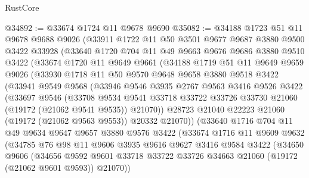 \begin{lexlean}{RustCore}
\begin{coremodule}
@34892 := @33674 @1724 @11 @9678 @9690
@35082 := @34188
    @1723
    @51
    @11
    @9678
    @9688
    @9026
    (@33911
      @1722
      @11
      @50
      @3501
      @9677
      @9687
      @3880
      @9500
      @3422
      @33928
      (@33640
        @1720
        @704
        @11
        @49
        @9663
        @9676
        @9686
        @3880
        @9510
        @3422
        (@33674
          @1720
          @11
          @9649
          @9661
          (@34188
            @1719
            @51
            @11
            @9649
            @9659
            @9026
            (@33930
              @1718
              @11
              @50
              @9570
              @9648
              @9658
              @3880
              @9518
              @3422
              (@33941
                @9549
                @9568
                (@33946
                  @9546
                  @3935
                  @2767
                  @9563
                  @3416
                  @9526
                  @3422
                  (@33697
                    @9546
                    (@33708
                      @9534
                      @9541
                      @33718
                      @33722
                      @33726
                      @33730
                      @21060
                      (@19172 (@21062 @9541 @9535))
                      @21070))
                  @28723
                  @21040
                  @22223
                  @21060
                  (@19172 (@21062 @9563 @9553))
                  @20332
                  @21070))
              (@33640
                @1716
                @704
                @11
                @49
                @9634
                @9647
                @9657
                @3880
                @9576
                @3422
                (@33674
                  @1716
                  @11
                  @9609
                  @9632
                  (@34785
                    @76
                    @98
                    @11
                    @9606
                    @3935
                    @9616
                    @9627
                    @3416
                    @9584
                    @3422
                    (@34650
                      @9606
                      (@34656
                        @9592
                        @9601
                        @33718
                        @33722
                        @33726
                        @34663
                        @21060
                        (@19172 (@21062 @9601 @9593))
                        @21070))

\end{coremodule}
\end{lexlean}
